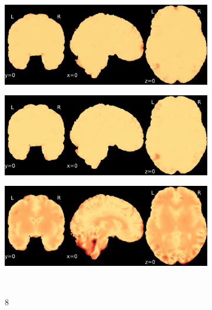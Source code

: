 \documentclass{article}
\begin{document}
\begin{appendices}
\begin{landscape}
\begin{figure}
\begin{subfigure}[t]{0.2\paperheight}
            \end{subfigure}
            \begin{subfigure}[t]{0.2\paperheight}
                \centering
                \includegraphics[width=\textwidth]{figures/sig/5mm/rr_ds002338_sub-xp201_sig.pdf}
            \end{subfigure}
            \begin{subfigure}[t]{0.2\paperheight}
                \centering
                \includegraphics[width=\textwidth]{figures/sig/5mm/rs_ds002338_sub-xp201_sig.pdf}
            \end{subfigure}
            \begin{subfigure}[t]{0.2\paperheight}
                \centering
                \includegraphics[width=\textwidth]{figures/sig/5mm/rr.rs_ds002338_sub-xp201_sig.pdf}
            \end{subfigure} \\
            \begin{subfigure}[b][][c]{0.01\paperwidth} 8 \vspace*{15pt} \end{subfigure}

\end{figure}
\end{landscape}
\end{appendices}
\end{document}
